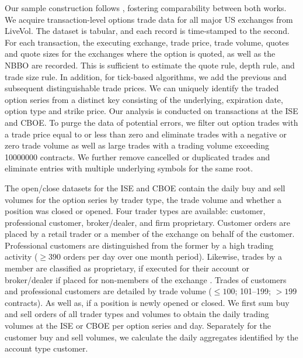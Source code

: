 
Our sample construction follows \textcite[][7--9]{grauerOptionTradeClassification2022}, fostering comparability between both works. We acquire transaction-level options trade data for all major US exchanges from LiveVol. The dataset is tabular, and each record is time-stamped to the second. For each transaction, the executing exchange, trade price, trade volume, quotes and quote sizes for the exchanges where the option is quoted, as well as the \gls{NBBO} are recorded. This is sufficient to estimate the quote rule, depth rule, and trade size rule. In addition, for tick-based algorithms, we add the previous and subsequent distinguishable trade prices. We can uniquely identify the traded option series from a distinct key consisting of the underlying, expiration date, option type and strike price. Our analysis is conducted on transactions at the \gls{ISE} and \gls{CBOE}. To purge the data of potential errors, we filter out option trades with a trade price equal to or less than zero and eliminate trades with a negative or zero trade volume as well as large trades with a trading volume exceeding \num{10000000} contracts. We further remove cancelled or duplicated trades and eliminate entries with multiple underlying symbols for the same root.

The open/close datasets for the \gls{ISE} and \gls{CBOE} contain the daily buy and sell volumes for the option series by trader type, the trade volume and whether a position was closed or opened. Four trader types are available: customer, professional customer, broker/dealer, and firm proprietary. Customer orders are placed by a retail trader or a member of the exchange on behalf of the customer. Professional customers are distinguished from the former by a high trading activity ($\geq390$ orders per day over one month period). Likewise, trades by a member are classified as proprietary, if executed for their account or broker/dealer if placed for non-members of the exchange \autocite[][2]{nasdaqincFrequentlyAskedQuestions2017}. Trades of customers and professional customers are detailed by trade volume ($\leq 100$; 101--199; $> 199$ contracts). As well as, if a position is newly opened or closed. We first sum buy and sell orders of all trader types and volumes to obtain the daily trading volumes at the \gls{ISE} or \gls{CBOE} per option series and day. Separately for the customer buy and sell volumes, we calculate the daily aggregates identified by the account type customer.

